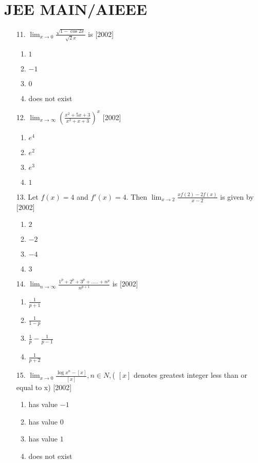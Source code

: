 \documentclass[journal,12pt,twocolumn]{IEEEtran}
\theoremstyle{remark}
\begin{document}
\section*{\textbf{JEE MAIN/AIEEE}}
\begin{enumerate}
    \item[ 11. ] $\lim_{x\to 0}{\frac{\sqrt{1-\cos{2x}}}{\sqrt{2}x}}$ is
	    \hfill[2002]
    \begin{enumerate}[label=(\alph*)]
			\item $1$
			\item $-1$
			\item $0$
			\item does not exist
		\end{enumerate}
    \item[ 12. ]  $\lim_{x\to \infty}({\frac{x^2+5x+3}{x^2+x+3}})^x$
	    \hfill[2002]
    \begin{enumerate}[label=(\alph*)]
			\item $e^4$
			\item $e^2$
			\item $e^3$
			\item $1$
		\end{enumerate}
    \item[ 13. ] Let $f(x)=4$ and $f'(x)=4$. Then $\lim_{x\to 2}{\frac{xf(2)-2f(x)}{x-2}}$ is given by
	    \hfill[2002]
    \begin{enumerate}[label=(\alph*)]
			\item $2$
			\item $-2$
			\item $-4$
			\item $3$
		\end{enumerate}
    \item[ 14. ] $\lim_{n\to \infty}{\frac{1^p+2^p+3^p+.....+n^p}{n^{p+1}}}$ is
	    \hfill[2002]
    \begin{enumerate}[label=(\alph*)]
			\item $\frac{1}{p+1}$
			\item $\frac{1}{1-p}$
			\item $\frac{1}{p}-\frac{1}{p-1}$
			\item $\frac{1}{p+2}$
		\end{enumerate}
  \newpage
    \item[ 15. ] $\lim_{x\to 0}{\frac{\log x^n- [x]}{[x]}}, n\in N, $( $[x]$ denotes greatest integer less than or equal to x)
	    \hfill[2002]
    \begin{enumerate}[label=(\alph*)]
			\item has value $-1$
			\item has value $0$
			\item has value $1$
			\item does not exist
		\end{enumerate}

\end{enumerate}
\end{document}
